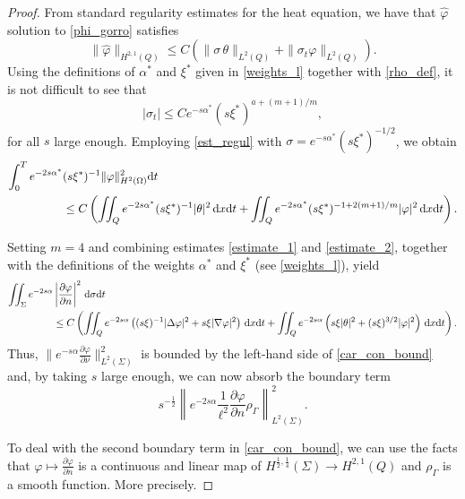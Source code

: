 \documentclass[preprint,10pt]{article}
\numberwithin{equation}{section}
\numberwithin{theorem}{section}
\def\dx{\,\textnormal{d}x}
\def\dt{\textnormal{d}t}
\def\d{\,\textnormal{d}}
\def\csbd{\rho_{\Gamma}}
\def\dx{\,\textnormal{d}x}
\def\dt{\textnormal{d}t}
\def\d{\,\textnormal{d}}
\begin{document}
{\begin{proof}
From standard regularity estimates for the heat equation, we have that $\widehat{\varphi}$ solution to \eqref{phi_gorro} satisfies
%
\begin{equation}\label{est_regul}
\|\widehat{\varphi}\|_{H^{2,1}(Q)}\leq C\left(\|\sigma\,\theta\|_{L^2(Q)}+\|\sigma_t\varphi\|_{L^2(Q)}\right).
\end{equation}
%
Using the definitions of $\alpha^*$ and $\xi^*$ given in \eqref{weights_l} together with \eqref{rho_def}, it is not difficult to see that 
%
\begin{equation*}
|\sigma_t|\leq Ce^{-s\alpha^*}(s\xi^*)^{a+{(m+1)}/{m}},
\end{equation*}
%
for all $s$ large enough. Employing  \eqref{est_regul} with $\sigma=e^{-s\alpha^*}(s\xi^*)^{-1/2}$, we obtain
%
\begin{equation}\label{estimate_2}
\begin{split}
\int_{0}^T e^{-2s\alpha^*}&(s\xi^{*})^{-1}\|\varphi\|_{H^2(\Omega)}^2\dt \\
&\leq C\left(\iint_Qe^{-2s\alpha^*}(s\xi^*)^{-1}|\theta|^2\dx\dt+\iint_Qe^{-2s\alpha^*}(s\xi^*)^{-1+2(m+1)/m}|\varphi|^2\dx\dt\right).
\end{split}
\end{equation}

Setting $m=4$ and combining estimates \eqref{estimate_1} and \eqref{estimate_2}, together with the definitions of the weights $\alpha^*$ and $\xi^*$ (see \eqref{weights_l}), yield
%
\begin{equation*}
\begin{split}
\iint_{\Sigma}e^{-2s\alpha}&\left|\frac{\partial \varphi}{\partial n}\right|^2\d\sigma\dt\\
&\leq C\left(\iint_Q e^{-2s\alpha}\left((s\xi)^{-1}|\Delta \varphi|^2 + s\xi|\nabla \varphi|^2\right)\dx\dt+\iint_Qe^{-2s\alpha}\left(s\xi|\theta|^2+(s\xi)^{3/2}|\varphi|^2\right)\dx\dt\right).
\end{split}
\end{equation*}
%
Thus, $\|e^{-s\alpha}\frac{\partial \varphi}{\partial \nu}\|_{L^2(\Sigma)}^2$ is bounded by the left-hand side of \eqref{car_con_bound} and, by taking $s$ large enough, we can now absorb the boundary term 
%
\begin{equation*}
s^{-\frac{1}{2}}\left\| e^{-2s\alpha} \frac{1}{\ell^2}\frac{\partial \varphi}{\partial n} \csbd \right\|^{2}_{L^2(\Sigma)}.
\end{equation*}

To deal with the second boundary term in \eqref{car_con_bound}, we can use the facts that $\varphi \mapsto \frac{\partial \varphi }{\partial n}$ is a continuous and linear map of $H^{\frac12,\frac14}(\Sigma)\to H^{2,1}(Q)$ and $\csbd$ is a smooth function. More precisely. 


\end{proof}}
\end{document}
